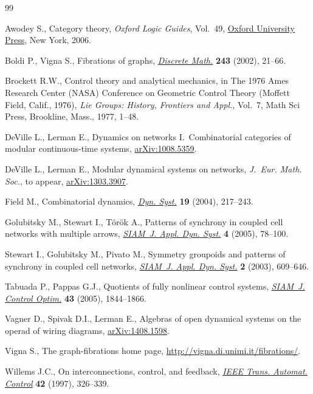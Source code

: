 \begin{thebibliography}{99}
\footnotesize \itemsep=0pt

Awodey S., Category theory, \textit{Oxford Logic Guides}, Vol.~49, \href{http://dx.doi.org/10.1093/acprof:oso/9780198568612.001.0001}{Oxford University Press}, New York, 2006.

Boldi P., Vigna S., Fibrations of graphs, \href{http://dx.doi.org/10.1016/S0012-365X(00)00455-6}{\textit{Discrete Math.}} \textbf{243}
  (2002), 21--66.

Brockett R.W., Control theory and analytical mechanics, in The 1976 {A}mes
  {R}esearch {C}enter ({NASA}) {C}onference on {G}eometric {C}ontrol {T}heory
  ({M}of\/fett {F}ield, {C}alif., 1976), \textit{Lie Groups: History, Frontiers
  and Appl.}, Vol.~7, Math Sci Press, Brookline, Mass., 1977, 1--48.

DeVille L., Lerman E., Dynamics on networks I.~Combinatorial categories of
  modular continuous-time systems, \href{http://arxiv.org/abs/1008.5359}{arXiv:1008.5359}.

DeVille L., Lerman E., Modular dynamical systems on networks, \textit{J.~Eur.
  Math. Soc.}, {t}o appear, \href{http://arxiv.org/abs/1303.3907}{arXiv:1303.3907}.

Field M., Combinatorial dynamics, \href{http://dx.doi.org/10.1080/14689360410001729379}{\textit{Dyn. Syst.}} \textbf{19} (2004),
  217--243.

Golubitsky M., Stewart I., T{\"o}r{\"o}k A., Patterns of synchrony in coupled
  cell networks with multiple arrows, \href{http://dx.doi.org/10.1137/040612634}{\textit{SIAM~J. Appl. Dyn. Syst.}}
  \textbf{4} (2005), 78--100.

Stewart I., Golubitsky M., Pivato M., Symmetry groupoids and patterns of
  synchrony in coupled cell networks, \href{http://dx.doi.org/10.1137/S1111111103419896}{\textit{SIAM~J. Appl. Dyn. Syst.}}
  \textbf{2} (2003), 609--646.

Tabuada P., Pappas G.J., Quotients of fully nonlinear control systems,
  \href{http://dx.doi.org/10.1137/S0363012901399027}{\textit{SIAM~J. Control Optim.}} \textbf{43} (2005), 1844--1866.

Vagner D., Spivak D.I., Lerman E., Algebras of open dynamical systems on the
  operad of wiring diagrams, \href{http://arxiv.org/abs/1408.1598}{arXiv:1408.1598}.

Vigna S., The graph-fibrations home page, \url{http://vigna.di.unimi.it/fibrations/}.

Willems J.C., On interconnections, control, and feedback, \href{http://dx.doi.org/10.1109/9.557576}{\textit{IEEE Trans.
  Automat. Control}} \textbf{42} (1997), 326--339.

\end{thebibliography}
